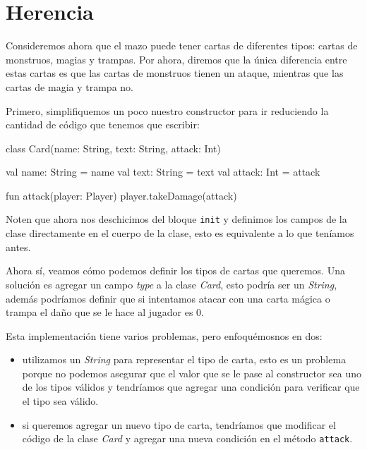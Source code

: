 \section{Herencia}
  Consideremos ahora que el mazo puede tener cartas de diferentes tipos: cartas de monstruos, 
  magias y trampas.
  Por ahora, diremos que la única diferencia entre estas cartas es que las cartas de monstruos
  tienen un ataque, mientras que las cartas de magia y trampa no.

  Primero, simplifiquemos un poco nuestro constructor para ir reduciendo la cantidad de código que
  tenemos que escribir:

  \begin{kotlin}
    class Card(name: String, text: String, attack: Int) {
      val name: String = name
      val text: String = text
      val attack: Int = attack
      
      fun attack(player: Player) {
        player.takeDamage(attack)
      }
    }
  \end{kotlin}

  Noten que ahora nos deschicimos del bloque \texttt{init} y definimos los campos de la clase
  directamente en el cuerpo de la clase, esto es equivalente a lo que teníamos antes.

  Ahora sí, veamos cómo podemos definir los tipos de cartas que queremos.
  Una solución es agregar un campo \textit{type} a la clase \textit{Card}, esto podría ser un 
  \textit{String}, además podríamos definir que si intentamos atacar con una carta mágica o trampa
  el daño que se le hace al jugador es 0.


  Esta implementación tiene varios problemas, pero enfoquémosnos en dos:

  \begin{itemize}
    \item utilizamos un \textit{String} para representar el tipo de carta, esto es un problema 
      porque no podemos asegurar que el valor que se le pase al constructor sea uno de los tipos
      válidos y tendríamos que agregar una condición para verificar que el tipo sea válido.
    \item si queremos agregar un nuevo tipo de carta, tendríamos que modificar el código de la
      clase \textit{Card} y agregar una nueva condición en el método \texttt{attack}.
  \end{itemize}

